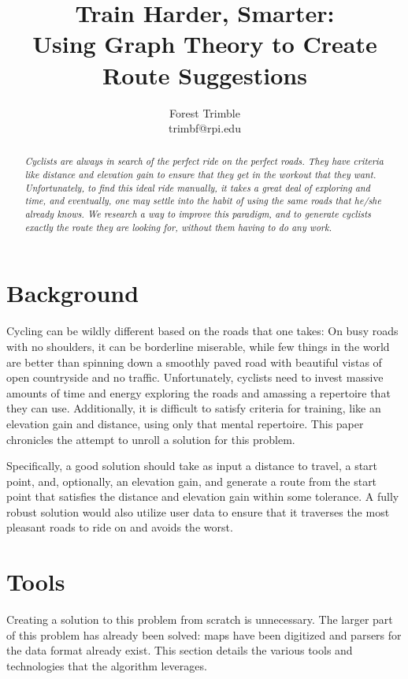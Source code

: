\documentclass[twocolumn,11pt]{article}
\title{Train Harder, Smarter:\\Using Graph Theory to Create Route Suggestions}
\author{Forest Trimble\\trimbf@rpi.edu}
\begin{document}
\setlength{\headheight}{15pt}

\pagestyle{fancy}
\fancyhead{}
\maketitle

\begin{abstract}
  \emph{Cyclists are always in search of the perfect ride on the perfect
  roads. They have criteria like distance and elevation gain to ensure
  that they get in the workout that they want. Unfortunately, to
  find this ideal ride manually, it takes a great deal of exploring and
  time, and eventually, one may settle into the habit of using the same
  roads that he/she already knows. We research a way to improve this
  paradigm, and to generate cyclists exactly the route they are looking
  for, without them having to do any work.}
\end{abstract}

\section{Background}

Cycling can be wildly different based on the roads that one takes: On busy
roads with no shoulders, it can be borderline miserable, while few things in
the world are better than spinning down a smoothly paved road with beautiful
vistas of open countryside and no traffic. Unfortunately, cyclists need to
invest massive amounts of time and energy exploring the roads and amassing a
repertoire that they can use. Additionally, it is difficult to satisfy criteria
for training, like an elevation gain and distance, using only that mental
repertoire. This paper chronicles the attempt to unroll a solution for this
problem.

Specifically, a good solution should take as input a distance to travel, a
start point, and, optionally, an elevation gain, and generate a route from the
start point that satisfies the distance and elevation gain within some
tolerance. A fully robust solution would also utilize user data to ensure that
it traverses the most pleasant roads to ride on and avoids the worst.

\section{Tools}

Creating a solution to this problem from scratch is unnecessary. The larger part
of this problem has already been solved: maps have been digitized and
parsers for the data format already exist. This section details the various
tools and technologies that the algorithm leverages.
\end{document}

